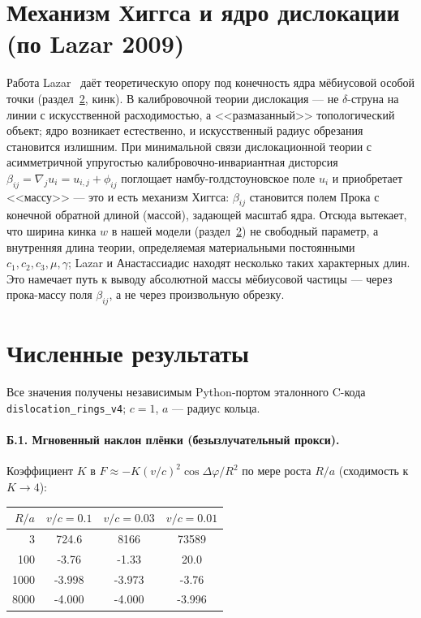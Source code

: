\documentclass[11pt,a4paper]{article}
\begin{document}
\appendix

\section{Механизм Хиггса и ядро дислокации (по Lazar 2009)}
\label{app:higgs}
Работа Lazar~\cite{LazarHiggs2009} даёт теоретическую опору под конечность
ядра мёбиусовой особой точки (раздел~\ref{app:num}, кинк). В калибровочной
теории дислокация --- не $\delta$-струна на линии с искусственной
расходимостью, а <<размазанный>> топологический объект; ядро возникает
естественно, и искусственный радиус обрезания становится излишним. При
минимальной связи дислокационной теории с асимметричной упругостью
калибровочно-инвариантная дисторсия $\beta_{ij}=\nabla_j u_i=u_{i,j}+\phi_{ij}$
поглощает намбу-голдстоуновское поле $u_i$ и приобретает <<массу>> ---
это и есть механизм Хиггса: $\beta_{ij}$ становится полем Прока с конечной
обратной длиной (массой), задающей масштаб ядра. Отсюда вытекает, что
ширина кинка $w$ в нашей модели (раздел~\ref{app:num}) не свободный
параметр, а внутренняя длина теории, определяемая материальными
постоянными $c_1,c_2,c_3,\mu,\gamma$; Lazar и Анастассиадис находят
несколько таких характерных длин. Это намечает путь к выводу абсолютной
массы мёбиусовой частицы --- через прока-массу поля $\beta_{ij}$, а не
через произвольную обрезку.

\section{Численные результаты}
\label{app:num}
Все значения получены независимым Python-портом эталонного C-кода
\texttt{dislocation\_rings\_v4}; $c=1$, $a$ --- радиус кольца.

\paragraph{Б.1. Мгновенный наклон плёнки (безызлучательный прокси).}
Коэффициент $K$ в $F\approx-K(v/c)^2\cos\Delta\varphi/R^2$ по мере роста
$R/a$ (сходимость к $K\to4$):
\begin{center}
\begin{tabular}{rccc}
\toprule
$R/a$ & $v/c=0.1$ & $v/c=0.03$ & $v/c=0.01$ \\
\midrule
3    & 724.6 & 8166 & 73589 \\
100  & -3.76 & -1.33 & 20.0 \\
1000 & -3.998 & -3.973 & -3.76 \\
8000 & -4.000 & -4.000 & -3.996 \\
\bottomrule
\end{tabular}
\end{center}
\end{document}
